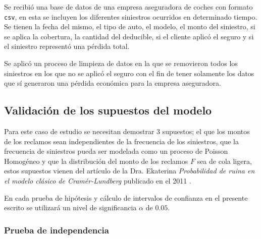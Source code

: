\documentclass[journal]{IEEEtran}
\begin{document}
            Se recibió una base de datos de una empresa aseguradora de coches con formato \texttt{csv}, en esta se incluyen los diferentes siniestros ocurridos en determinado tiempo. Se tienen la fecha del mismo, el tipo de auto, el modelo, el monto del siniestro, si se aplica la cobertura, la cantidad del deducible, si el cliente aplicó el seguro y si el siniestro representó una pérdida total.
        
            Se aplicó un proceso de limpieza de datos en la que se removieron todos los siniestros en los que no se aplicó el seguro con el fin de tener solamente los datos que sí generaron una pérdida económica para la empresa aseguradora.

        \subsection{Validación de los supuestos del modelo}

            Para este caso de estudio se necesitan demostrar 3 supuestos; el que los montos de los reclamos sean independientes de la frecuencia de los siniestros, que la frecuencia de siniestros pueda ser modelada como un proceso de Poisson Homogéneo y que la distribución del monto de los reclamos $F$ sea de cola ligera, estos supuestos vienen del artículo de la Dra. Ekaterina \emph{Probabilidad de ruina en el modelo clásico de Cramér-Lundberg} publicado en el 2011 \cite{ekaterina}.

            En cada prueba de hipótesis y cálculo de intervalos de confianza en el presente escrito se utilizará un nivel de significancia $\alpha$ de $0.05$.

            \subsubsection{Prueba de independencia}
            
\end{document}
